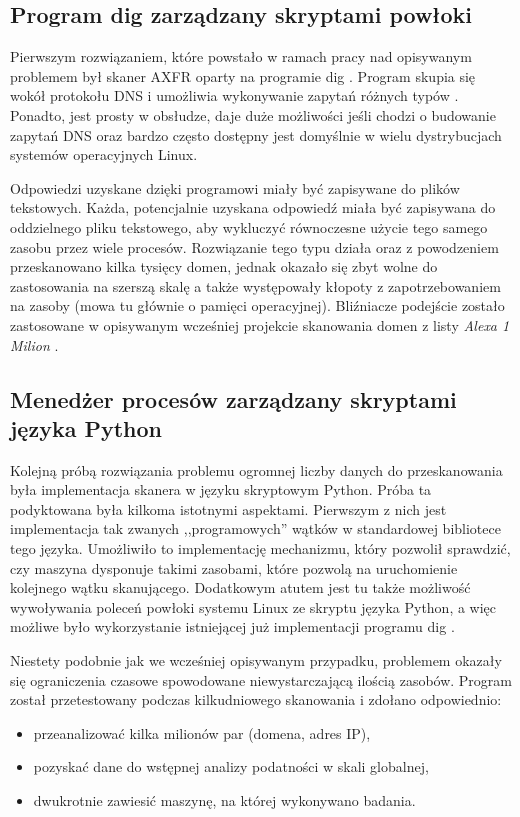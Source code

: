 \subsection{Program dig zarządzany skryptami powłoki}
\label{dig_sh}
Pierwszym rozwiązaniem, które powstało w ramach pracy nad opisywanym problemem był skaner AXFR oparty na programie
dig \cite{isc}. Program skupia się wokół protokołu DNS i umożliwia wykonywanie zapytań różnych typów \cite{Liu:2006:DB:1197828}.
Ponadto, jest prosty w obsłudze, daje duże możliwości jeśli chodzi o budowanie zapytań DNS oraz bardzo często dostępny jest
domyślnie w wielu dystrybucjach systemów operacyjnych Linux.

Odpowiedzi uzyskane dzięki programowi miały być zapisywane do plików tekstowych. Każda, potencjalnie uzyskana odpowiedź miała
być zapisywana do oddzielnego pliku tekstowego, aby wykluczyć równoczesne użycie tego samego zasobu przez wiele procesów.
Rozwiązanie tego typu działa oraz z powodzeniem przeskanowano kilka tysięcy domen, jednak okazało się zbyt wolne do zastosowania
na szerszą skalę a także występowały kłopoty z zapotrzebowaniem na zasoby (mowa tu głównie o pamięci operacyjnej). Bliźniacze
podejście zostało zastosowane w opisywanym wcześniej projekcie skanowania domen z listy \textit{Alexa 1 Milion} \cite{scans.io}.

\subsection{Menedżer procesów zarządzany skryptami języka Python}
Kolejną próbą rozwiązania problemu ogromnej liczby danych do przeskanowania była implementacja skanera w języku skryptowym Python.
Próba ta podyktowana była kilkoma istotnymi aspektami. Pierwszym z nich jest implementacja tak zwanych ,,programowych'' wątków w
standardowej bibliotece tego języka. Umożliwiło to implementację mechanizmu, który pozwolił sprawdzić, czy maszyna dysponuje
takimi zasobami, które pozwolą na uruchomienie kolejnego wątku skanującego. Dodatkowym atutem jest tu także możliwość wywoływania
poleceń powłoki systemu Linux ze skryptu języka Python, a więc możliwe było wykorzystanie istniejącej już implementacji programu
dig \cite{isc}.

Niestety podobnie jak we wcześniej opisywanym przypadku, problemem okazały się ograniczenia czasowe spowodowane niewystarczającą
ilością zasobów. Program został przetestowany podczas kilkudniowego skanowania i zdołano odpowiednio:
\begin{itemize}
	\item przeanalizować kilka milionów par (domena, adres IP),
	\item pozyskać dane do wstępnej analizy podatności w skali globalnej,
	\item dwukrotnie zawiesić maszynę, na której wykonywano badania.
\end{itemize}

